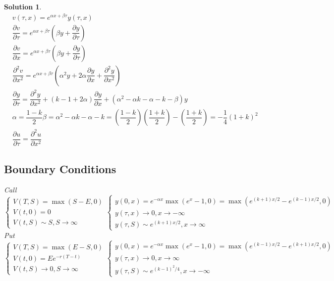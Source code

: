 \documentclass[16pt]{article}
\newtheorem{sol}{Solution}[section]
\begin{document}
\begin{sol}
		\begin{eqnarray*}
		    &v(\tau, x) = e^{\alpha x + \beta \tau} y(\tau, x) \\
			&\dfrac{\partial v}{\partial \tau} = e^{\alpha x + \beta \tau} \left(\beta y  + \dfrac{\partial y}{\partial \tau}\right) \\
			&\dfrac{\partial v}{\partial x} = e^{\alpha x + \beta \tau} \left(\beta y  + \dfrac{\partial y}{\partial \tau}\right) \\
			&\dfrac{\partial^2 v}{\partial x^2} = e^{\alpha x + \beta \tau} \left(\alpha^2 y
			  +  2 \alpha \dfrac{\partial y}{\partial x} + \dfrac{\partial^2 y}{\partial x^2}\right) \\
			&\dfrac{\partial y}{\partial \tau} = \dfrac{\partial^2 y }{\partial x^2} + 
			\left(k -1 + 2\alpha\right)\dfrac{\partial y}{\partial x} +
			\left(\alpha^2 - \alpha k - \alpha  - k  - \beta\right) y \\
			&\alpha = \dfrac{1 - k}{2} 
			\beta =  \alpha^2 - \alpha k - \alpha  - k 	 = \left(\dfrac{1- k}{2}\right)	 \left(\dfrac{1+ k}{2}\right) -  \left(\dfrac{1 + k}{2}\right)	 = -\dfrac{1}{4}(1+k)^2 \\
			&\dfrac{\partial u}{\partial \tau} = \dfrac{\partial^2 u}{\partial x^2}		
		\end{eqnarray*}
	
		\subsection{Boundary Conditions}
		Call
		\begin{equation}
			\begin{cases}
				V(T,S) = \max\left(S - E, 0\right) \\
				V(t,0) = 0 \\
				V(t,S) \sim  S, S \rightarrow \infty
			\end{cases}
			\begin{cases}
				y(0,x) = e^{-\alpha x}\max\left(e^x - 1, 0\right) = \max\left(e^{(k+1)x/2} - e^{(k-1)x/2}, 0\right) \\
				y(\tau,x) \rightarrow 0, x \rightarrow - \infty \\
				y(\tau,S) \sim  e^{(k+1)x/2}, x \rightarrow \infty
			\end{cases}
		\end{equation}
		Put
		\begin{equation}
			\begin{cases}
				V(T,S) = \max\left(E - S, 0\right) \\
				V(t,0) = Ee^{-r(T-t)} \\
				V(t,S)  \rightarrow  0 , S \rightarrow \infty
			\end{cases}
			\begin{cases}
				y(0,x) = e^{-\alpha x}\max\left(e^x - 1, 0\right) = \max\left(e^{(k-1)x/2} - e^{(k+1)x/2}, 0\right) \\
				y(\tau,x) \rightarrow 0, x \rightarrow  \infty \\
				y(\tau,S) \sim  e^{(k-1)^2/4}, x \rightarrow  -\infty
			\end{cases}
		\end{equation}
			
	
		\end{sol}
	
	
\end{document}
